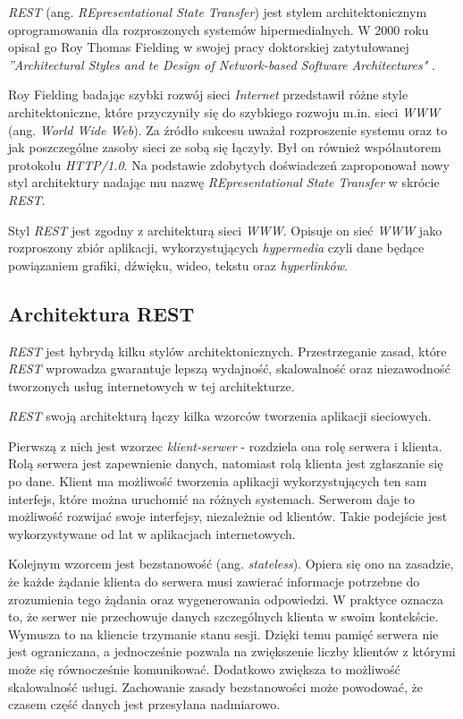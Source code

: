 \textsl{REST} (ang. \textsl{REpresentational State Transfer}) jest stylem architektonicznym oprogramowania dla rozproszonych systemów hipermedialnych. W 2000 roku opisał go Roy Thomas Fielding w swojej pracy doktorskiej zatytułowanej \textsl{''Architectural Styles and te Design of Network-based Software Architectures"} \cite{restinpractice}.

Roy Fielding badając  szybki rozwój sieci \textsl{Internet} przedstawił różne style architektoniczne, które przyczyniły się do szybkiego rozwoju m.in. sieci \textsl{WWW} (ang. \textsl{World Wide Web}). Za źródło sukcesu  uważał rozproszenie systemu oraz to jak poszczególne zasoby sieci ze sobą się łączyły. Był on również współautorem protokołu \textsl{HTTP/1.0}. Na podstawie zdobytych doświadczeń zaproponował nowy styl  architektury nadając mu nazwę \textsl{REpresentational State Transfer} w skrócie \textsl{REST}.  

Styl \textsl{REST} jest  zgodny z architekturą sieci \textsl{WWW}. Opisuje on sieć \textsl{WWW} jako rozproszony zbiór aplikacji, wykorzystujących \textsl{hypermedia} czyli dane będące powiązaniem grafiki, dźwięku, wideo, tekstu oraz \textsl{hyperlinków}. 

\subsection{Architektura REST}
\textsl{REST} jest hybrydą kilku stylów architektonicznych. Przestrzeganie zasad, które \textsl{REST} wprowadza gwarantuje lepszą wydajność, skalowalność oraz niezawodność tworzonych usług internetowych w tej architekturze. 

\textsl{REST} swoją architekturą łączy kilka wzorców tworzenia aplikacji sieciowych.

Pierwszą z nich jest wzorzec \textsl{klient-serwer} - rozdziela ona rolę serwera i klienta. Rolą serwera jest zapewnienie danych, natomiast rolą klienta jest zgłaszanie się po dane. Klient ma możliwość tworzenia aplikacji wykorzystujących ten sam interfejs, które można uruchomić na różnych systemach. Serwerom daje to możliwość rozwijać swoje interfejsy, niezależnie od klientów. Takie podejście jest wykorzystywane od lat w aplikacjach internetowych.

Kolejnym wzorcem jest bezstanowość (ang. \textsl{stateless}). Opiera się ono na zasadzie, że każde żądanie klienta do serwera musi zawierać informacje potrzebne do zrozumienia tego żądania oraz wygenerowania odpowiedzi. W praktyce oznacza to, że serwer nie przechowuje danych szczególnych klienta w swoim kontekście. Wymusza to na kliencie trzymanie stanu sesji. Dzięki temu pamięć serwera nie jest ograniczana, a jednocześnie pozwala na zwiększenie liczby klientów z którymi może się równocześnie komunikować. Dodatkowo zwiększa to możliwość skalowalność usługi. Zachowanie zasady bezstanowości może powodować, że czasem część danych jest przesyłana nadmiarowo.

